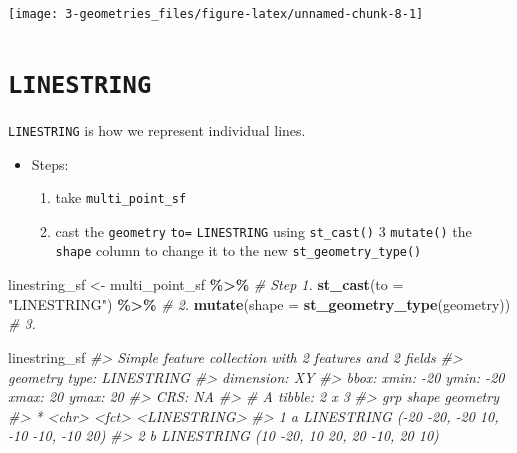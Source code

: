 \documentclass[
]{report}
\newenvironment{Shaded}{\begin{snugshade}}{\end{snugshade}}
\newcommand{\CommentTok}[1]{\textcolor[rgb]{0.56,0.35,0.01}{\textit{#1}}}
\newcommand{\DataTypeTok}[1]{\textcolor[rgb]{0.13,0.29,0.53}{#1}}
\newcommand{\KeywordTok}[1]{\textcolor[rgb]{0.13,0.29,0.53}{\textbf{#1}}}
\newcommand{\NormalTok}[1]{#1}
\newcommand{\OperatorTok}[1]{\textcolor[rgb]{0.81,0.36,0.00}{\textbf{#1}}}
\newcommand{\StringTok}[1]{\textcolor[rgb]{0.31,0.60,0.02}{#1}}
\providecommand{\tightlist}{%
  \setlength{\itemsep}{0pt}\setlength{\parskip}{0pt}}
\begin{document}
\begin{center}\texttt{[image: 3-geometries\_files/figure-latex/unnamed-chunk-8-1]} \end{center}

\hypertarget{linestring}{%
\section{\texorpdfstring{\texttt{LINESTRING}}{LINESTRING}}\label{linestring}}

\texttt{LINESTRING} is how we represent individual lines.

\begin{itemize}
\tightlist
\item
  Steps:

  \begin{enumerate}
  \def\labelenumi{\arabic{enumi}.}
  \tightlist
  \item
    take \texttt{multi\_point\_sf}
  \item
    cast the \texttt{geometry} \texttt{to=} \texttt{LINESTRING} using \texttt{st\_cast()}
    3 \texttt{mutate()} the \texttt{shape} column to change it to the new \texttt{st\_geometry\_type()}
  \end{enumerate}
\end{itemize}

\begin{Shaded}
\begin{Highlighting}[]
\NormalTok{linestring\_sf \textless{}{-}}\StringTok{ }\NormalTok{multi\_point\_sf }\OperatorTok{\%\textgreater{}\%}\StringTok{          }\CommentTok{\# Step 1.}
\StringTok{  }\KeywordTok{st\_cast}\NormalTok{(}\DataTypeTok{to =} \StringTok{"LINESTRING"}\NormalTok{) }\OperatorTok{\%\textgreater{}\%}\StringTok{             }\CommentTok{\# 2.}
\StringTok{  }\KeywordTok{mutate}\NormalTok{(}\DataTypeTok{shape =} \KeywordTok{st\_geometry\_type}\NormalTok{(geometry)) }\CommentTok{\# 3.}

\NormalTok{linestring\_sf}
\CommentTok{\#\textgreater{} Simple feature collection with 2 features and 2 fields}
\CommentTok{\#\textgreater{} geometry type:  LINESTRING}
\CommentTok{\#\textgreater{} dimension:      XY}
\CommentTok{\#\textgreater{} bbox:           xmin: {-}20 ymin: {-}20 xmax: 20 ymax: 20}
\CommentTok{\#\textgreater{} CRS:            NA}
\CommentTok{\#\textgreater{} \# A tibble: 2 x 3}
\CommentTok{\#\textgreater{}   grp   shape                                geometry}
\CommentTok{\#\textgreater{} * \textless{}chr\textgreater{} \textless{}fct\textgreater{}                            \textless{}LINESTRING\textgreater{}}
\CommentTok{\#\textgreater{} 1 a     LINESTRING ({-}20 {-}20, {-}20 10, {-}10 {-}10, {-}10 20)}
\CommentTok{\#\textgreater{} 2 b     LINESTRING     (10 {-}20, 10 20, 20 {-}10, 20 10)}
\end{Highlighting}
\end{Shaded}
\end{document}
